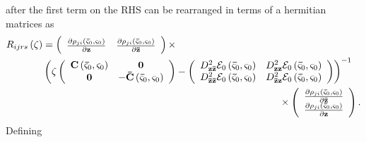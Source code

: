 \documentclass[aps,preprint]{revtex4}%
\begin{document}
after the first term on the RHS can be rearranged in terms of a hermitian
matrices as
\begin{align}
R_{ijrs}\left(  \zeta\right)   &  =\left(
\begin{array}
[c]{cc}%
\frac{\partial\rho_{ji}\left(  \mathbf{\bar{\varsigma}}_{0},\mathbf{\varsigma
}_{0}\right)  }{\partial\mathbf{z}} & \frac{\partial\rho_{ji}\left(
\mathbf{\bar{\varsigma}}_{0},\mathbf{\varsigma}_{0}\right)  }{\partial
\mathbf{\bar{z}}}%
\end{array}
\right)  \times\nonumber\\
&  \left(  \zeta\left(
\begin{array}
[c]{cc}%
\mathbf{C}\left(  \mathbf{\bar{\varsigma}}_{0},\mathbf{\varsigma}_{0}\right)
& \mathbf{0}\\
\mathbf{0} & -\mathbf{\bar{C}}\left(  \mathbf{\bar{\varsigma}}_{0}%
,\mathbf{\varsigma}_{0}\right)
\end{array}
\right)  -\left(
\begin{array}
[c]{cc}%
D_{\mathbf{z\bar{z}}}^{2}\mathcal{E}_{0}\left(  \mathbf{\bar{\varsigma}}%
_{0},\mathbf{\varsigma}_{0}\right)  & D_{\mathbf{zz}}^{2}\mathcal{E}%
_{0}\left(  \mathbf{\bar{\varsigma}}_{0},\mathbf{\varsigma}_{0}\right) \\
D_{\mathbf{\bar{z}\bar{z}}}^{2}\mathcal{E}_{0}\left(  \mathbf{\bar{\varsigma}%
}_{0},\mathbf{\varsigma}_{0}\right)  & D_{\mathbf{\bar{z}z}}^{2}%
\mathcal{E}_{0}\left(  \mathbf{\bar{\varsigma}}_{0},\mathbf{\varsigma}%
_{0}\right)
\end{array}
\right)  \right)  ^{-1}\nonumber\\
&  \qquad\qquad\qquad\qquad\qquad\qquad\qquad\qquad\qquad\qquad\qquad
\qquad\times\left(
\begin{array}
[c]{c}%
\frac{\partial\rho_{ji}\left(  \mathbf{\bar{\varsigma}}_{0},\mathbf{\varsigma
}_{0}\right)  }{\partial\mathbf{\bar{z}}}\\
\frac{\partial\rho_{ji}\left(  \mathbf{\bar{\varsigma}}_{0},\mathbf{\varsigma
}_{0}\right)  }{\partial\mathbf{z}}%
\end{array}
\right)  . \label{hermres}%
\end{align}
Defining
\end{document}
